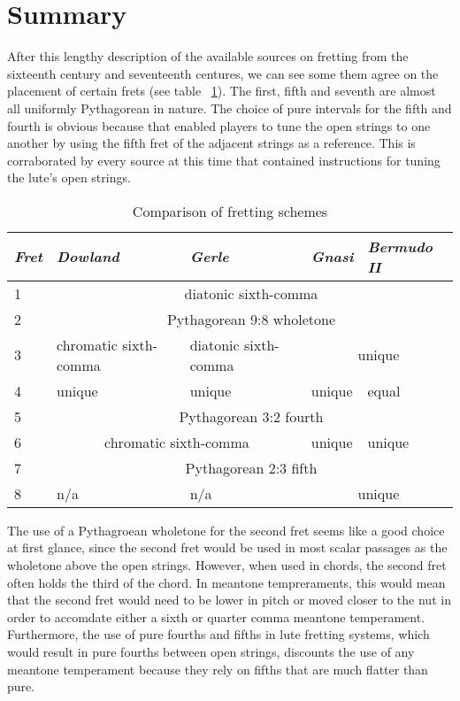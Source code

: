 \section{Summary}
After this lengthy description of the available sources on fretting from the sixteenth century
and seventeenth centures,
we can see some them agree on the placement of certain frets (see table ~\ref{table:comparison}).
The first, fifth and seventh are  almost all uniformly Pythagorean in nature.  The choice of pure
intervals for the fifth and fourth
is obvious because that enabled players to tune the open strings to one another by using the fifth
fret of the adjacent strings as a reference.  This is corraborated by every source at this time
that contained instructions for tuning the lute's open strings.

\begin{table}[h!]
  \begin{center}
    \begin{tabular}{ l l l l l }
      \textit{Fret} & \textit{Dowland} & \textit{Gerle} & \textit{Gnasi} & \textit{Bermudo II} \\
      \hline
      1 & \multicolumn{4}{|c|}{\cellcolor[gray]{0.9}diatonic sixth-comma} \\
      2 & \multicolumn{4}{|c|}{\cellcolor[gray]{0.9}Pythagorean 9:8 wholetone} \\
      3 & chromatic sixth-comma & diatonic sixth-comma & \multicolumn{2}{|c|}{\cellcolor[gray]{0.9}unique} \\
      4 & unique & unique & unique & equal \\
      5 & \multicolumn{4}{|c|}{\cellcolor[gray]{0.9}Pythagorean 3:2 fourth} \\
      6 & \multicolumn{2}{|c|}{\cellcolor[gray]{0.9}chromatic sixth-comma} & unique & unique \\
      7 & \multicolumn{4}{|c|}{\cellcolor[gray]{0.9}Pythagorean 2:3 fifth} \\
      8 & n/a & n/a & \multicolumn{2}{|c|}{\cellcolor[gray]{0.9}unique} \\
    \end{tabular}
  \end{center}
  \caption{Comparison of fretting schemes}
  \label{table:comparison}
\end{table}

The use of a Pythagroean wholetone for the second fret seems like a good choice at first glance,
since the second fret would be used in most scalar passages as the wholetone above the open
strings.  However, when used in chords, the second fret often holds the third of the chord.
In meantone tempreraments, this would mean that the second fret would need to be lower in
pitch or moved closer to the nut in order to accomdate either a sixth or quarter comma meantone
temperament.  Furthermore, the use of pure fourths and fifths in  lute fretting systems,
which would result in pure fourths between open strings, discounts the use of any meantone
temperament because they rely on fifths that are much flatter than pure.

